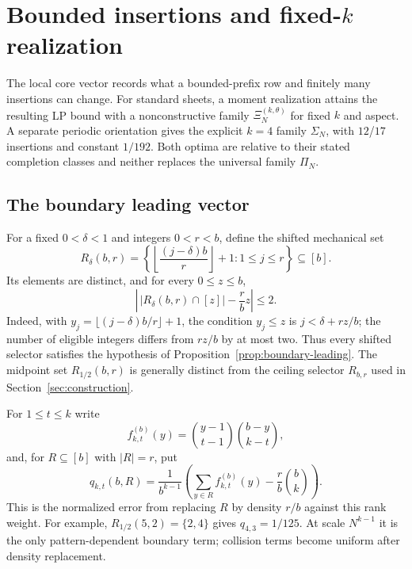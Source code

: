 \section{Bounded insertions and fixed-\texorpdfstring{$k$}{k} realization}\label{sec:sharp-four}
The local core vector records what a bounded-prefix row and finitely many
insertions can change.  For standard sheets, a moment realization attains
the resulting LP bound with a nonconstructive family
$\Xi_N^{(k,\theta)}$ for fixed $k$ and aspect.  A separate periodic orientation gives the explicit
$k=4$ family $\Sigma_N$, with $12$/$17$ insertions and constant $1/192$.
Both optima are relative to their stated completion classes and neither
replaces the universal family $\Pi_N$.

\subsection{The boundary leading vector}

For a fixed $0<\delta<1$ and integers $0<r<b$, define the shifted
mechanical set
\[
 R_\delta(b,r)=
 \left\{\left\lfloor\frac{(j-\delta)b}{r}\right\rfloor+1:
          1\le j\le r\right\}\subseteq[b].
\]
Its elements are distinct, and for every $0\le z\le b$,
\begin{equation}\label{eq:shifted-prefix}
 \left|\,|R_\delta(b,r)\cap[z]|-\frac rbz\right|\le2.
\end{equation}
Indeed, with $y_j=\lfloor(j-\delta)b/r\rfloor+1$, the condition
$y_j\le z$ is $j<\delta+rz/b$; the number of eligible integers differs
from $rz/b$ by at most two.  Thus every shifted selector satisfies the
hypothesis of Proposition~\ref{prop:boundary-leading}.  The midpoint set
$R_{1/2}(b,r)$ is generally distinct from the ceiling selector $R_{b,r}$
used in Section~\ref{sec:construction}.

For $1\le t\le k$ write
\[
 f_{k,t}^{(b)}(y)=
 \binom{y-1}{t-1}\binom{b-y}{k-t},
\]
and, for $R\subseteq[b]$ with $|R|=r$, put
\begin{equation}\label{eq:q-boundary}
 q_{k,t}(b,R)=\frac1{b^{k-1}}
 \left(\sum_{y\in R}f_{k,t}^{(b)}(y)
       -\frac rb\binom bk\right).
\end{equation}
This is the normalized error from replacing $R$ by density $r/b$ against
this rank weight.  For example, $R_{1/2}(5,2)=\{2,4\}$ gives
$q_{4,3}=1/125$.  At scale $N^{k-1}$ it is the only pattern-dependent
boundary term; collision terms become uniform after density replacement.

